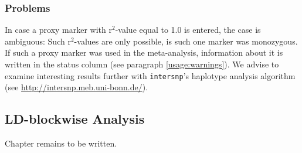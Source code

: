 \subsubsection{Problems}

In case a proxy marker with r$^2$-value equal to 1.0 is entered, the case is ambiguous: Such r$^2$-values are only possible, is such one marker was monozygous. If such a proxy marker was used in the meta-analysis, information about it is written in the status column (see paragraph \ref{usage:warnings}). We advise to examine interesting results further with \texttt{intersnp}'s haplotype analysis algorithm (see \url{http://intersnp.meb.uni-bonn.de/}).


\subsection{LD-blockwise Analysis}
\label{algo:ldblockwise}

\alert{Chapter remains to be written.}
